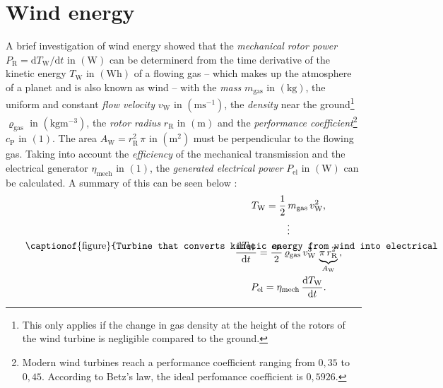 \section{Wind energy}
A brief investigation of wind energy showed that the \emph{mechanical rotor power} $P_{\mathrm R} = \mathrm{d} T_{\mathrm W}/\mathrm{d} t$ in $\left(\mathrm W \right)$ can be determinerd from the time derivative of the kinetic energy $T_{\mathrm W}$ in $\left(\mathrm{Wh} \right)$ of a flowing gas -- which makes up the atmosphere of a planet and is also known as wind -- with the \emph{mass} $m_{\mathrm {gas}}$ in $\left(\mathrm{kg} \right)$, the uniform and constant \emph{flow velocity} $v_{\mathrm W}$ in $\left(\mathrm{m} \mathrm{s^{-1}}\right)$, the \emph{density} near the ground\footnote{This only applies if the change in gas density at the height of the rotors of the wind turbine is negligible compared to the ground.} $\varrho_{\mathrm {gas}}$ in $\left(\mathrm{kg} \mathrm{m}^{-3}\right)$, the \emph{rotor radius} $r_{\mathrm{R}}$ in $\left(\mathrm{m}\right)$ and the \emph{performance coefficient}\footnote{Modern wind turbines reach a performance coefficient ranging from $0,35$ to $0,45$. According to Betz's law, the ideal perfomance coefficient is $0,5926$.} $c_{\mathrm P}$ in $\left( 1 \right)$. The area $A_\mathrm{W} = r_{\mathrm{R}}^2 \, \pi$ in $\left(\mathrm{m}^2 \right)$ must be perpendicular to the flowing gas. Taking into account the \emph{efficiency} of the mechanical transmission and the electrical generator $\eta_{\mathrm{mech}}$ in $\left( 1 \right)$, the \emph{generated electrical power} $P_{\mathrm{el}}$ in $\left(\mathrm W \right)$ can be calculated. A summary of this can be seen below \cite{Rebhan:2002, Flosdorff:2008, Hau:2016, Gawlik:2018}:
\begin{equation}
	\vcenter{\hbox{\begin{minipage}{.5\textwidth}
		\centering
		
		\captionof{figure}{Turbine that converts kinetic energy from wind into electrical energy. The dashed circle represents the area $A_\mathrm{W}$ that is perpendicular to a flowing gas.}
	\end{minipage}}}
	\qquad\qquad
		\begin{gathered}
		T_{\mathrm W} = \frac{1}{2} \, m_{\mathrm {gas}} \, v_{\mathrm W}^2 \text{,}
		\\
		\vdots
		\\
		\dfrac{\mathrm{d} T_{\mathrm W}}{\mathrm{d} t} = \frac{c_{\mathrm P}}{2} \, \varrho_{\mathrm {gas}} \, v_{\mathrm W}^3 \, \underbrace{\pi \, r_{\mathrm{R}}^2}_{A_\mathrm{W}} \text{,}
		\\
		P_{\mathrm{el}} = \eta_{\mathrm{mech}} \, \dfrac{\mathrm{d} T_{\mathrm W}}{\mathrm{d} t} \text{.}
	\end{gathered}
\end{equation}

